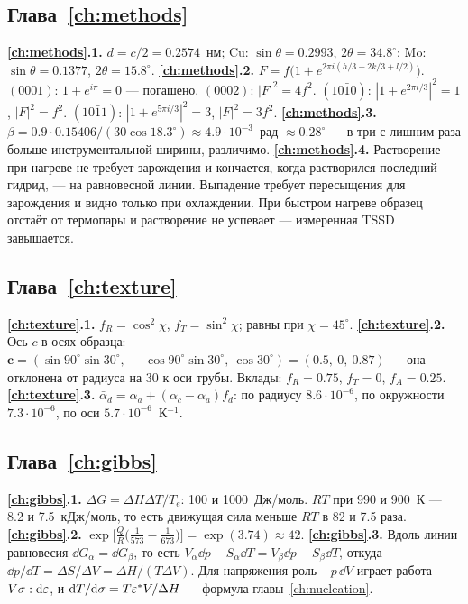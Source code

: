 \subsection*{Глава~\ref{ch:methods}}
\textbf{\ref{ch:methods}.1.} $d = c/2 = 0.2574$~нм; Cu: $\sin\theta = 0.2993$, $2\theta = 34.8^\circ$; Mo: $\sin\theta = 0.1377$, $2\theta = 15.8^\circ$.
\textbf{\ref{ch:methods}.2.} $F = f\bigl(1 + e^{2\pi i(h/3 + 2k/3 + l/2)}\bigr)$. $(0001)$: $1 + e^{i\pi} = 0$ --- погашено. $(0002)$:
$|F|^2 = 4f^2$. $(10\bar10)$: $|1 + e^{2\pi i/3}|^2 = 1$, $|F|^2 = f^2$. $(10\bar11)$: $|1 + e^{5\pi i/3}|^2 = 3$, $|F|^2 = 3f^2$.
\textbf{\ref{ch:methods}.3.} $\beta = 0.9\cdot0.15406/(30\cos18.3^\circ)\approx4.9\cdot10^{-3}$~рад $\approx0.28^\circ$ --- в три с лишним раза
больше инструментальной ширины, различимо.
\textbf{\ref{ch:methods}.4.} Растворение при нагреве не требует зарождения и кончается, когда растворился последний гидрид, --- на
равновесной линии. Выпадение требует пересыщения для зарождения и видно только при охлаждении. При быстром нагреве
образец отстаёт от термопары и растворение не успевает --- измеренная TSSD завышается.

\subsection*{Глава~\ref{ch:texture}}
\textbf{\ref{ch:texture}.1.} $f_R = \cos^2\chi$, $f_T = \sin^2\chi$; равны при $\chi = 45^\circ$.
\textbf{\ref{ch:texture}.2.} Ось $c$ в осях образца:
$\mathbf c = (\sin90^\circ\sin30^\circ,\ -\cos90^\circ\sin30^\circ,\ \cos30^\circ) = (0.5,\ 0,\ 0.87)$ --- она отклонена
от радиуса на 30\textdegree{} к оси трубы. Вклады: $f_R = 0.75$, $f_T = 0$, $f_A = 0.25$.
\textbf{\ref{ch:texture}.3.} $\bar\alpha_d = \alpha_a + (\alpha_c - \alpha_a)f_d$: по радиусу $8.6\cdot10^{-6}$, по окружности $7.3\cdot10^{-6}$, по оси
$5.7\cdot10^{-6}$~К$^{-1}$.

\subsection*{Глава~\ref{ch:gibbs}}
\textbf{\ref{ch:gibbs}.1.} $\Delta G = \Delta H\Delta T/T_e$: 100 и 1000~Дж/моль. $RT$ при 990 и 900~К --- 8.2 и 7.5~кДж/моль, то есть
движущая сила меньше $RT$ в 82 и 7.5 раза.
\textbf{\ref{ch:gibbs}.2.} $\exp\bigl[\frac{Q}{R}\bigl(\frac1{573}-\frac1{673}\bigr)\bigr] = \exp(3.74)\approx42$.
\textbf{\ref{ch:gibbs}.3.} Вдоль линии равновесия $\dd G_\alpha = \dd G_\beta$, то есть $V_\alpha\dd p - S_\alpha\dd T = V_\beta\dd p -
S_\beta\dd T$, откуда $\dd p/\dd T = \Delta S/\Delta V = \Delta H/(T\Delta V)$. Для напряжения роль $-p\,\dd V$ играет работа
$V\sigma:\mathrm{d}\varepsilon$, и $\mathrm{d} T/\mathrm{d}\sigma = T\varepsilon^*V/\Delta H$ --- формула главы~\ref{ch:nucleation}.

